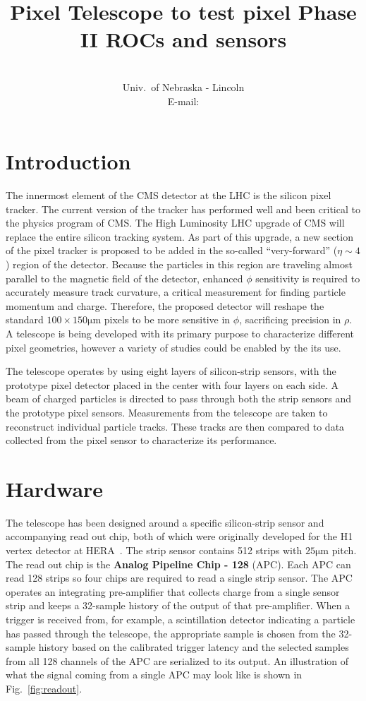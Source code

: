 \documentclass{PoS}
\title{Pixel Telescope to test pixel Phase II ROCs and sensors}
\author{\speaker{Caleb Fangmeier}\\
  Univ.\ of Nebraska \-- Lincoln\\
  E-mail: \email{cfangmei@cern.ch}}
\newcommand{\micron}{\si{\micro\meter}}
\begin{document}
\section{Introduction}

The innermost element of the CMS detector at the LHC is the silicon pixel
tracker. The current version of the tracker has performed well and been
critical to the physics program of CMS. The High Luminosity LHC upgrade of CMS
will replace the entire silicon tracking system.  As part of this upgrade, a
new section of the pixel tracker is proposed to be added in the so-called
``very-forward'' ($\eta\sim4$) region of the detector. Because the particles in
this region are traveling almost parallel to the magnetic field of the
detector, enhanced $\phi$ sensitivity is required to accurately measure track
curvature, a critical measurement for finding particle momentum and charge.
Therefore, the proposed detector will reshape the standard
$100\times150\micron$ pixels to be more sensitive in $\phi$, sacrificing
precision in $\rho$. A telescope is being developed with its primary purpose to
characterize different pixel geometries, however a variety of studies could be
enabled by the its use.

The telescope operates by using eight layers of silicon-strip sensors, with the
prototype pixel detector placed in the center with four layers on each side. A beam of
charged particles is directed to pass through both the strip
sensors and the prototype pixel sensors.  Measurements from the telescope are
taken to reconstruct individual particle tracks. These tracks are then compared
to data collected from the pixel sensor to characterize its performance.

\section{Hardware}
The telescope has been designed around a specific silicon-strip sensor and
accompanying read out chip, both of which were originally developed for the H1
vertex detector at HERA~\cite{Hilgers2001}. The strip sensor contains 512 strips
with $25\micron$ pitch. The read out chip is the {\bf Analog Pipeline Chip
  \-- 128} (APC).  Each APC can read 128 strips so four chips are required to read a
single strip sensor. The APC operates an integrating pre-amplifier that
collects charge from a single sensor strip and keeps a 32-sample history of the
output of that pre-amplifier. When a trigger is received from, for example, a
scintillation detector indicating a particle has passed through the telescope,
the appropriate sample is chosen from the 32-sample history based on the
calibrated trigger latency and the selected samples from all 128 channels of
the APC are serialized to its output. An illustration of what the signal coming
from a single APC may look like is shown in Fig.~\ref{fig:readout}. 
\end{document}
